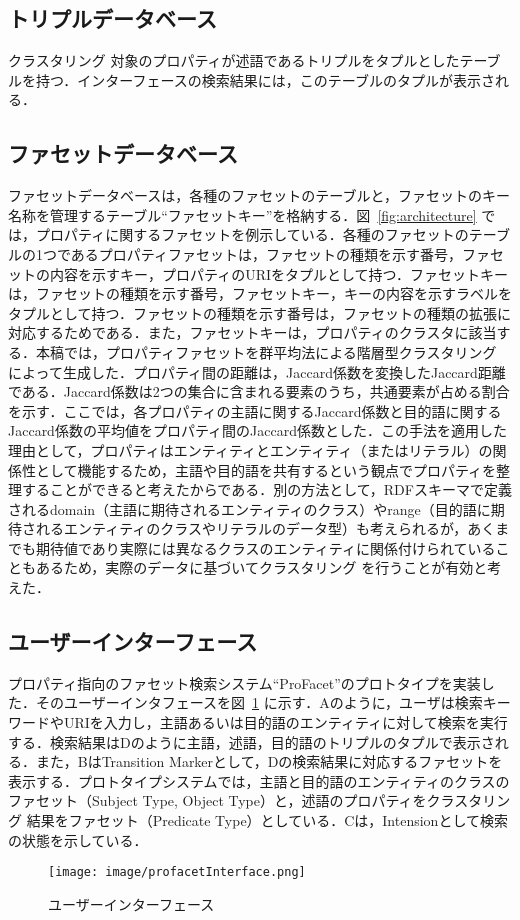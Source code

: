 \subsection{トリプルデータベース}
クラスタリング 対象のプロパティが述語であるトリプルをタプルとしたテーブルを持つ．インターフェースの検索結果には，このテーブルのタプルが表示される．
%
\subsection{ファセットデータベース}
ファセットデータベースは，各種のファセットのテーブルと，ファセットのキー名称を管理するテーブル``ファセットキー''を格納する．図~\ref{fig:architecture} では，プロパティに関するファセットを例示している．各種のファセットのテーブルの1つであるプロパティファセットは，ファセットの種類を示す番号，ファセットの内容を示すキー，プロパティのURIをタプルとして持つ．ファセットキーは，ファセットの種類を示す番号，ファセットキー，キーの内容を示すラベルをタプルとして持つ．ファセットの種類を示す番号は，ファセットの種類の拡張に対応するためである．また，ファセットキーは，プロパティのクラスタに該当する．本稿では，プロパティファセットを群平均法による階層型クラスタリング によって生成した．プロパティ間の距離は，Jaccard係数を変換したJaccard距離である．Jaccard係数は2つの集合に含まれる要素のうち，共通要素が占める割合を示す．ここでは，各プロパティの主語に関するJaccard係数と目的語に関するJaccard係数の平均値をプロパティ間のJaccard係数とした．この手法を適用した理由として，プロパティはエンティティとエンティティ（またはリテラル）の関係性として機能するため，主語や目的語を共有するという観点でプロパティを整理することができると考えたからである．別の方法として，RDFスキーマで定義されるdomain（主語に期待されるエンティティのクラス）やrange（目的語に期待されるエンティティのクラスやリテラルのデータ型）も考えられるが，あくまでも期待値であり実際には異なるクラスのエンティティに関係付けられていることもあるため，実際のデータに基づいてクラスタリング を行うことが有効と考えた．
%
\subsection{ユーザーインターフェース}
プロパティ指向のファセット検索システム``ProFacet''のプロトタイプを実装した．そのユーザーインタフェースを図~\ref{fig:profacetInterface} に示す．Aのように，ユーザは検索キーワードやURIを入力し，主語あるいは目的語のエンティティに対して検索を実行する．検索結果はDのように主語，述語，目的語のトリプルのタプルで表示される．また，BはTransition Markerとして，Dの検索結果に対応するファセットを表示する．プロトタイプシステムでは，主語と目的語のエンティティのクラスのファセット（Subject Type, Object Type）と，述語のプロパティをクラスタリング 結果をファセット（Predicate Type）としている．Cは，Intensionとして検索の状態を示している．

\begin{figure}[h]
\centering
\texttt{[image: image/profacetInterface.png]}
\caption{\small
ユーザーインターフェース
}
\label{fig:profacetInterface}
\end{figure}
